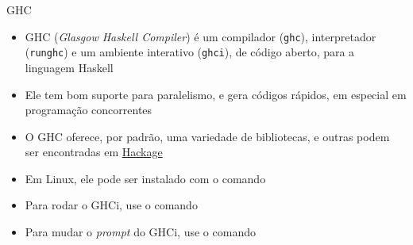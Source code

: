 \begin{frame}[fragile]{GHC}

    \begin{itemize}
        \item GHC (\textit{Glasgow Haskell Compiler}) é um compilador (\texttt{ghc}),
            interpretador (\texttt{runghc}) e um ambiente interativo (\texttt{ghci}), de 
            código aberto, para a linguagem Haskell

        \item Ele tem bom suporte para paralelismo, e gera códigos rápidos, em especial em
            programação concorrentes

        \item O GHC oferece, por padrão, uma variedade de bibliotecas, e outras podem ser 
            encontradas em \href{https://hackage.haskell.org/}{Hackage}
 
        \item Em Linux, ele pode ser instalado com o comando


        \item Para rodar o GHCi, use o comando


        \item Para mudar o \textit{prompt} do GHCi, use o comando 


    \end{itemize}

\end{frame}
